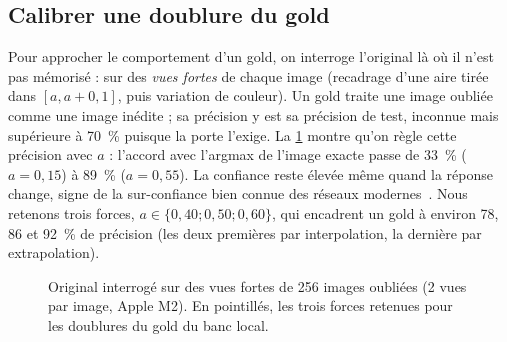 \documentclass[11pt,a4paper]{article}
\begin{document}
\subsection{Calibrer une doublure du gold}\label{sec:calibration}
Pour approcher le comportement d'un gold, on interroge l'original là où il n'est pas mémorisé :
sur des \emph{vues fortes} de chaque image (recadrage d'une aire tirée dans $[a,a+0{,}1]$, puis
variation de couleur). Un gold traite une image oubliée comme une image inédite ; sa précision y
est sa précision de test, inconnue mais supérieure à \SI{70}{\percent} puisque la porte l'exige.
La \cref{fig:calibration} montre qu'on règle cette précision avec $a$ : l'accord avec l'argmax de
l'image exacte passe de \SI{33}{\percent} ($a=0{,}15$) à \SI{89}{\percent} ($a=0{,}55$). La
confiance reste élevée même quand la réponse change, signe de la sur-confiance bien connue des
réseaux modernes~\cite{guo2017}. Nous retenons trois forces, $a\in\{0{,}40;0{,}50;0{,}60\}$, qui
encadrent un gold à environ 78, 86 et \SI{92}{\percent} de précision (les deux premières par
interpolation, la dernière par extrapolation).

\begin{figure}[ht]
  \centering
  \caption{Original interrogé sur des vues fortes de 256 images oubliées (2 vues par image, Apple
  M2). En pointillés, les trois forces retenues pour les doublures du gold du banc local.}
  \label{fig:calibration}
\end{figure}
\end{document}
